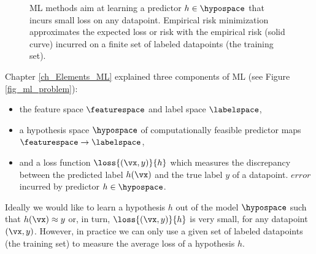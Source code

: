 \documentclass[12pt]{report}
\begin{document}
\begin{figure}[htbp]
\begin{center}
     \vspace*{-4mm}
\end{center}
\caption{ML methods aim at learning a predictor $h \in \hypospace$ that incurs 
	small loss on any datapoint. Empirical risk minimization approximates the
    expected loss or risk with the empirical risk (solid curve) incurred on a 
    finite set of labeled datapoints (the training set).}
\label{fig_ERM_idea}
\end{figure}


Chapter \ref{ch_Elements_ML} explained three components of ML (see Figure \ref{fig_ml_problem}): 
\begin{itemize} 
\item the feature space $\featurespace$ and label space $\labelspace$, 
\item a hypothesis space $\hypospace$ of computationally feasible predictor maps $\featurespace \rightarrow \labelspace$, 
\item and a loss function $\loss{(\vx,y)}{h}$ which measures the discrepancy between the predicted label $h(\vx)$ and 
the true label $y$ of a datapoint. $ error $ incurred by predictor $h \in \hypospace$. 
\end{itemize} 
Ideally we would like to learn a hypothesis $h$ out of the model $\hypospace$ 
such that $h(\vx) \approx y$ or, in turn,  $\loss{(\vx,y)}{h}$ is very small, 
for any datapoint $(\vx,y)$. However, in practice we can only use a given 
set of labeled datapoints (the training set) to measure the average loss 
of a hypothesis $h$. 
\end{document}
